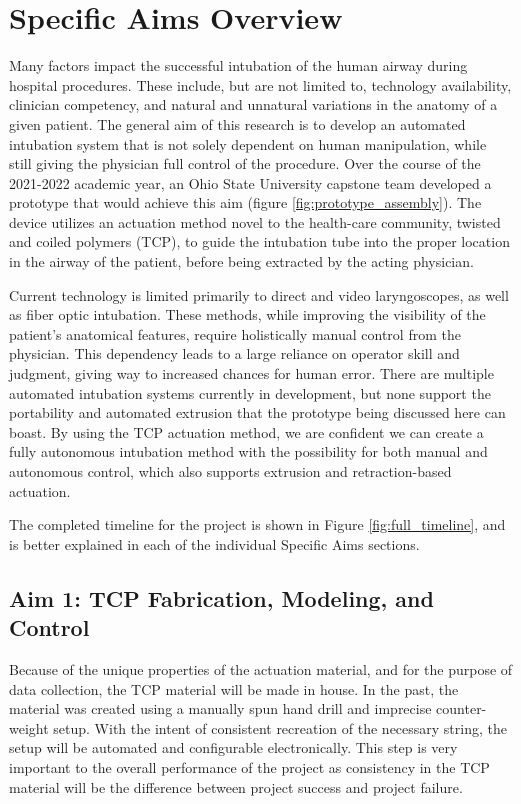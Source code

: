 \section*{Specific Aims Overview}
\label{parts:specific_aims_overview}

	Many factors impact the successful intubation of the human airway during hospital procedures. These include, but are not limited to, technology availability, clinician competency, and natural and unnatural variations in the anatomy of a given patient. The general aim of this research is to develop an automated intubation system that is not solely dependent on human manipulation, while still giving the physician full control of the procedure. Over the course of the 2021-2022 academic year, an Ohio State University capstone team developed a prototype that would achieve this aim (figure \ref{fig:prototype_assembly}). The device utilizes an actuation method novel to the health-care community, twisted and coiled polymers (TCP), to guide the intubation tube into the proper location in the airway of the patient, before being extracted by the acting physician.

	Current technology is limited primarily to direct and video laryngoscopes, as well as fiber optic intubation. These methods, while improving the visibility of the patient's anatomical features, require holistically manual control from the physician. This dependency leads to a large reliance on operator skill and judgment, giving way to increased chances for human error. There are multiple automated intubation systems currently in development, but none support the portability and automated extrusion that the prototype being discussed here can boast. By using the TCP actuation method, we are confident we can create a fully autonomous intubation method with the possibility for both manual and autonomous control, which also supports extrusion and retraction-based actuation.

	The completed timeline for the project is shown in Figure \ref{fig:full_timeline}, and is better explained in each of the individual Specific Aims sections.

	\subsection{Aim 1: TCP Fabrication, Modeling, and Control}
	\label{subsect:aim1}
	
		Because of the unique properties of the actuation material, and for the purpose of data collection, the TCP material will be made in house. In the past, the material was created using a manually spun hand drill and imprecise counter-weight setup. With the intent of consistent recreation of the necessary string, the setup will be automated and configurable electronically. This step is very important to the overall performance of the project as consistency in the TCP material will be the difference between project success and project failure.
	
